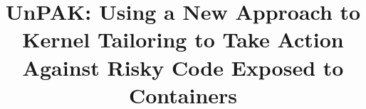\documentclass[sigplan,screen]{acmart}
\begin{document}
\renewcommand\footnotetextcopyrightpermission[1]{} %
\pagestyle{plain} %
%
\title{UnPAK: Using a New Approach to Kernel Tailoring to Take Action Against Risky Code Exposed to Containers}




\maketitle










%


\end{document}
